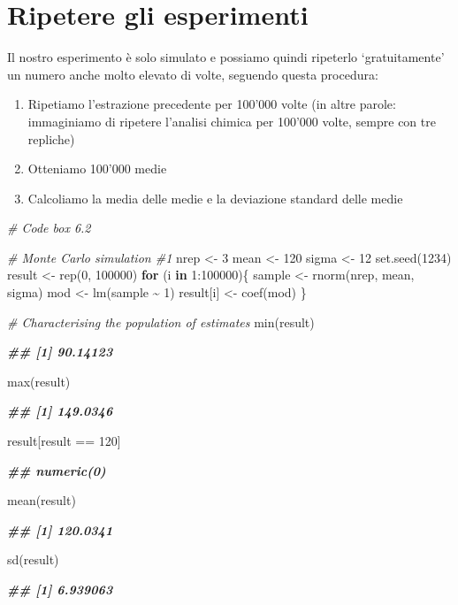 \documentclass[
  12pt,
]{book}
\newenvironment{Shaded}{\begin{snugshade}}{\end{snugshade}}
\newcommand{\CommentTok}[1]{\textcolor[rgb]{0.56,0.35,0.01}{\textit{#1}}}
\newcommand{\ControlFlowTok}[1]{\textcolor[rgb]{0.13,0.29,0.53}{\textbf{#1}}}
\newcommand{\DecValTok}[1]{\textcolor[rgb]{0.00,0.00,0.81}{#1}}
\newcommand{\DocumentationTok}[1]{\textcolor[rgb]{0.56,0.35,0.01}{\textbf{\textit{#1}}}}
\newcommand{\FunctionTok}[1]{\textcolor[rgb]{0.00,0.00,0.00}{#1}}
\newcommand{\NormalTok}[1]{#1}
\newcommand{\OtherTok}[1]{\textcolor[rgb]{0.56,0.35,0.01}{#1}}
\newcommand{\SpecialCharTok}[1]{\textcolor[rgb]{0.00,0.00,0.00}{#1}}
\providecommand{\tightlist}{%
  \setlength{\itemsep}{0pt}\setlength{\parskip}{0pt}}
\begin{document}
\hypertarget{ripetere-gli-esperimenti}{%
\section{Ripetere gli esperimenti}\label{ripetere-gli-esperimenti}}

Il nostro esperimento è solo simulato e possiamo quindi ripeterlo `gratuitamente' un numero anche molto elevato di volte, seguendo questa procedura:

\begin{enumerate}
\def\labelenumi{\arabic{enumi}.}
\tightlist
\item
  Ripetiamo l'estrazione precedente per 100'000 volte (in altre parole: immaginiamo di ripetere l'analisi chimica per 100'000 volte, sempre con tre repliche)
\item
  Otteniamo 100'000 medie
\item
  Calcoliamo la media delle medie e la deviazione standard delle medie
\end{enumerate}

\begin{Shaded}
\begin{Highlighting}[]
\CommentTok{\# Code box 6.2}

\CommentTok{\# Monte Carlo simulation \#1}
\NormalTok{nrep }\OtherTok{\textless{}{-}} \DecValTok{3}
\NormalTok{mean }\OtherTok{\textless{}{-}} \DecValTok{120}
\NormalTok{sigma }\OtherTok{\textless{}{-}} \DecValTok{12}
\FunctionTok{set.seed}\NormalTok{(}\DecValTok{1234}\NormalTok{)}
\NormalTok{result }\OtherTok{\textless{}{-}} \FunctionTok{rep}\NormalTok{(}\DecValTok{0}\NormalTok{, }\DecValTok{100000}\NormalTok{)}
\ControlFlowTok{for}\NormalTok{ (i }\ControlFlowTok{in} \DecValTok{1}\SpecialCharTok{:}\DecValTok{100000}\NormalTok{)\{}
\NormalTok{  sample }\OtherTok{\textless{}{-}} \FunctionTok{rnorm}\NormalTok{(nrep, mean, sigma)}
\NormalTok{  mod }\OtherTok{\textless{}{-}} \FunctionTok{lm}\NormalTok{(sample }\SpecialCharTok{\textasciitilde{}} \DecValTok{1}\NormalTok{)}
\NormalTok{  result[i] }\OtherTok{\textless{}{-}} \FunctionTok{coef}\NormalTok{(mod)}
\NormalTok{\}}

\CommentTok{\# Characterising the population of estimates}
\FunctionTok{min}\NormalTok{(result)}

\DocumentationTok{\#\# [1] 90.14123}

\FunctionTok{max}\NormalTok{(result)}

\DocumentationTok{\#\# [1] 149.0346}

\NormalTok{result[result }\SpecialCharTok{==} \DecValTok{120}\NormalTok{]}

\DocumentationTok{\#\# numeric(0)}

\FunctionTok{mean}\NormalTok{(result)}

\DocumentationTok{\#\# [1] 120.0341}

\FunctionTok{sd}\NormalTok{(result)}

\DocumentationTok{\#\# [1] 6.939063}
\end{Highlighting}
\end{Shaded}
\end{document}
